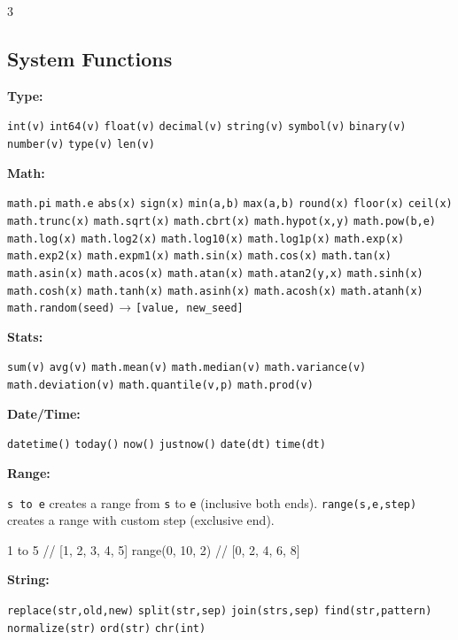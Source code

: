 \documentclass[8pt,landscape,a4paper,oneside]{article}
\newenvironment{Shaded}{%
  \begin{snugshade}%
  \vspace{0.4\baselineskip}%
  \fontsize{9}{10}\selectfont%
  \setlength{\parskip}{0pt}%
  \setlength{\topsep}{0pt}%
  \setlength{\partopsep}{0pt}%
}{%
  \vspace{0.01\baselineskip}%
  \end{snugshade}%
}
\newcommand{\NormalTok}[1]{#1}
\begin{document}
\begin{multicols*}{3}
\subsection{System Functions}\label{system-functions}

\textbf{Type:}

\texttt{int(v)} \texttt{int64(v)} \texttt{float(v)} \texttt{decimal(v)}
\texttt{string(v)} \texttt{symbol(v)} \texttt{binary(v)}
\texttt{number(v)} \texttt{type(v)} \texttt{len(v)}

\textbf{Math:}

\texttt{math.pi} \texttt{math.e} \texttt{abs(x)} \texttt{sign(x)}
\texttt{min(a,b)} \texttt{max(a,b)} \texttt{round(x)} \texttt{floor(x)}
\texttt{ceil(x)} \texttt{math.trunc(x)} \texttt{math.sqrt(x)}
\texttt{math.cbrt(x)} \texttt{math.hypot(x,y)} \texttt{math.pow(b,e)}
\texttt{math.log(x)} \texttt{math.log2(x)} \texttt{math.log10(x)}
\texttt{math.log1p(x)} \texttt{math.exp(x)} \texttt{math.exp2(x)}
\texttt{math.expm1(x)} \texttt{math.sin(x)} \texttt{math.cos(x)}
\texttt{math.tan(x)} \texttt{math.asin(x)} \texttt{math.acos(x)}
\texttt{math.atan(x)} \texttt{math.atan2(y,x)} \texttt{math.sinh(x)}
\texttt{math.cosh(x)} \texttt{math.tanh(x)} \texttt{math.asinh(x)}
\texttt{math.acosh(x)} \texttt{math.atanh(x)} \texttt{math.random(seed)}
→ \texttt{{[}value,\ new\_seed{]}}

\textbf{Stats:}

\texttt{sum(v)} \texttt{avg(v)} \texttt{math.mean(v)}
\texttt{math.median(v)} \texttt{math.variance(v)}
\texttt{math.deviation(v)} \texttt{math.quantile(v,p)}
\texttt{math.prod(v)}

\textbf{Date/Time:}

\texttt{datetime()} \texttt{today()} \texttt{now()} \texttt{justnow()}
\texttt{date(dt)} \texttt{time(dt)}

\textbf{Range:}

\texttt{s\ to\ e} creates a range from \texttt{s} to \texttt{e}
(inclusive both ends). \texttt{range(s,e,step)} creates a range with
custom step (exclusive end).

\begin{Shaded}
\begin{Highlighting}[]
\NormalTok{1 to 5                 // [1, 2, 3, 4, 5]}
\NormalTok{range(0, 10, 2)        // [0, 2, 4, 6, 8]}
\end{Highlighting}
\end{Shaded}

\textbf{String:}

\texttt{replace(str,old,new)} \texttt{split(str,sep)}
\texttt{join(strs,sep)} \texttt{find(str,pattern)}
\texttt{normalize(str)} \texttt{ord(str)} \texttt{chr(int)}


\end{multicols*}
\end{document}
